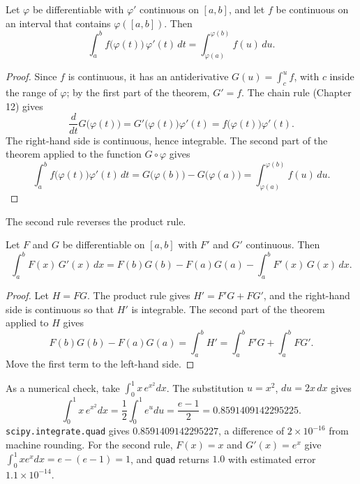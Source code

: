 \begin{proposisi}[Substitution]
Let $\varphi$ be differentiable with $\varphi'$ continuous on $[a,b]$, and let $f$ be
continuous on an interval that contains $\varphi([a,b])$. Then
\[
\int_a^b f\bigl(\varphi(t)\bigr)\,\varphi'(t)\,dt
=\int_{\varphi(a)}^{\varphi(b)}f(u)\,du .
\]
\end{proposisi}

\begin{proof}
Since $f$ is continuous, it has an antiderivative $G(u)=\int_c^u f$, with $c$ inside the
range of $\varphi$; by the first part of the theorem, $G'=f$. The chain rule (Chapter 12)
gives
\[
\frac{d}{dt}G\bigl(\varphi(t)\bigr)=G'\bigl(\varphi(t)\bigr)\varphi'(t)
=f\bigl(\varphi(t)\bigr)\varphi'(t).
\]
The right-hand side is continuous, hence integrable. The second part of the theorem applied to the function
$G\circ\varphi$ gives
\[
\int_a^b f\bigl(\varphi(t)\bigr)\varphi'(t)\,dt
=G\bigl(\varphi(b)\bigr)-G\bigl(\varphi(a)\bigr)
=\int_{\varphi(a)}^{\varphi(b)}f(u)\,du .
\]
\end{proof}

The second rule reverses the product rule.

\begin{proposisi}
Let $F$ and $G$ be differentiable on $[a,b]$ with $F'$ and $G'$ continuous. Then
\[
\int_a^b F(x)\,G'(x)\,dx=F(b)G(b)-F(a)G(a)-\int_a^b F'(x)\,G(x)\,dx .
\]
\end{proposisi}

\begin{proof}
Let $H=FG$. The product rule gives $H'=F'G+FG'$, and the right-hand side is continuous
so that $H'$ is integrable. The second part of the theorem applied to $H$ gives
\[
F(b)G(b)-F(a)G(a)=\int_a^b H'=\int_a^b F'G+\int_a^b FG' .
\]
Move the first term to the left-hand side.
\end{proof}


As a numerical check, take $\int_0^1 x\,e^{x^2}dx$. The substitution $u=x^2$,
$du=2x\,dx$ gives
\[
\int_0^1 x\,e^{x^2}dx=\frac12\int_0^1 e^{u}du=\frac{e-1}{2}=0.8591409142295225 .
\]
\texttt{scipy.integrate.quad} gives $0.8591409142295227$, a difference of $2\times10^{-16}$
from machine rounding. For the second rule, $F(x)=x$ and $G'(x)=e^x$ give
$\int_0^1 xe^xdx=e-(e-1)=1$, and \texttt{quad} returns $1.0$ with estimated
error $1.1\times10^{-14}$.

